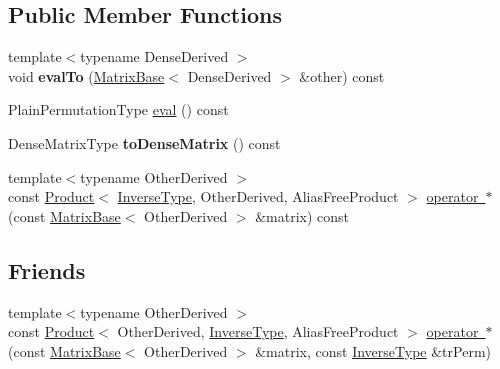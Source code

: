 \subsection*{Public Member Functions}
\begin{DoxyCompactItemize}
\item 
\mbox{\label{class_eigen_1_1_inverse_impl_3_01_permutation_type_00_01_permutation_storage_01_4_a15b46084ae2bff6f2ee7f257ed15352f}} 
{\footnotesize template$<$typename Dense\+Derived $>$ }\\void {\bfseries eval\+To} (\mbox{\hyperlink{class_eigen_1_1_matrix_base}{Matrix\+Base}}$<$ Dense\+Derived $>$ \&other) const
\item 
Plain\+Permutation\+Type \mbox{\hyperlink{class_eigen_1_1_inverse_impl_3_01_permutation_type_00_01_permutation_storage_01_4_a9048319f60dc98831ddfd25a5f7d69a7}{eval}} () const
\item 
\mbox{\label{class_eigen_1_1_inverse_impl_3_01_permutation_type_00_01_permutation_storage_01_4_a17d9216ffff2de32c56b6ff82a3c2a9d}} 
Dense\+Matrix\+Type {\bfseries to\+Dense\+Matrix} () const
\item 
{\footnotesize template$<$typename Other\+Derived $>$ }\\const \mbox{\hyperlink{class_eigen_1_1_product}{Product}}$<$ \mbox{\hyperlink{class_eigen_1_1_inverse}{Inverse\+Type}}, Other\+Derived, Alias\+Free\+Product $>$ \mbox{\hyperlink{class_eigen_1_1_inverse_impl_3_01_permutation_type_00_01_permutation_storage_01_4_a9f602a2da356dc3fbf0363529934ddac}{operator $\ast$}} (const \mbox{\hyperlink{class_eigen_1_1_matrix_base}{Matrix\+Base}}$<$ Other\+Derived $>$ \&matrix) const
\end{DoxyCompactItemize}
\subsection*{Friends}
\begin{DoxyCompactItemize}
\item 
{\footnotesize template$<$typename Other\+Derived $>$ }\\const \mbox{\hyperlink{class_eigen_1_1_product}{Product}}$<$ Other\+Derived, \mbox{\hyperlink{class_eigen_1_1_inverse}{Inverse\+Type}}, Alias\+Free\+Product $>$ \mbox{\hyperlink{class_eigen_1_1_inverse_impl_3_01_permutation_type_00_01_permutation_storage_01_4_ae4c9e9b29b5caa6a617262fa60b16c57}{operator $\ast$}} (const \mbox{\hyperlink{class_eigen_1_1_matrix_base}{Matrix\+Base}}$<$ Other\+Derived $>$ \&matrix, const \mbox{\hyperlink{class_eigen_1_1_inverse}{Inverse\+Type}} \&tr\+Perm)
\end{DoxyCompactItemize}


